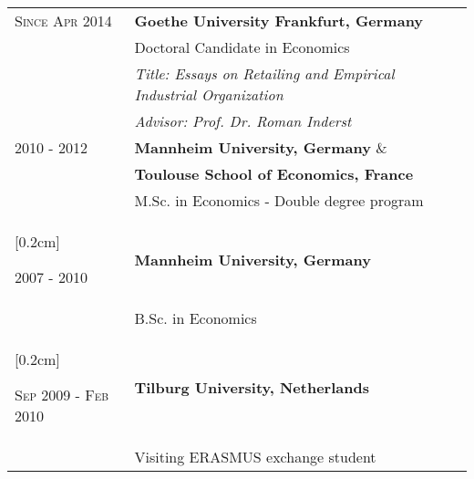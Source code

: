 \documentclass[a4paper,10pt]{article} %
\begin{document}
\begin{tabular}{P{4.5cm} P{11cm}}
\textsc{Since  Apr 2014}  & \textbf{Goethe University Frankfurt, Germany} \\
	& Doctoral Candidate in Economics  \\
	&\small \emph{Title: Essays on Retailing and Empirical Industrial Organization} \\
	&\small \emph{Advisor: Prof. Dr. Roman Inderst} \\[0.2cm] 


 \textsc{2010 - 2012} & \textbf{Mannheim University, Germany} \&  \\
 & \textbf{Toulouse School of Economics, France} \\ 
									&	 M.Sc. in Economics - Double degree program    \\
									[0.2cm] 


 \textsc{2007 - 2010} &  \textbf{Mannheim University, Germany}  \\
										 & B.Sc. in Economics  \\
									[0.2cm] 

	\textsc{Sep 2009 - Feb 2010} & \textbf{Tilburg University, Netherlands}   \\
										  & Visiting ERASMUS exchange student  \\[0.2cm] 



\end{tabular}


\end{document}
